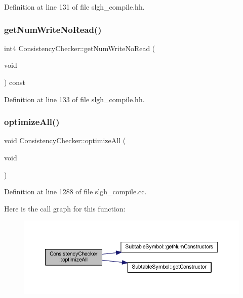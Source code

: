 Definition at line 131 of file slgh\+\_\+compile.\+hh.

\mbox{\label{class_consistency_checker_a340ac3876e27c5bdc0d0aecef6140c67}} 
\subsubsection{\texorpdfstring{getNumWriteNoRead()}{getNumWriteNoRead()}}
{\footnotesize\ttfamily int4 Consistency\+Checker\+::get\+Num\+Write\+No\+Read (\begin{DoxyParamCaption}\item[{void}]{ }\end{DoxyParamCaption}) const\hspace{0.3cm}{\ttfamily [inline]}}



Definition at line 133 of file slgh\+\_\+compile.\+hh.

\mbox{\label{class_consistency_checker_a8baa2abf8f67bb15d60e7ad3f2c28f52}} 
\subsubsection{\texorpdfstring{optimizeAll()}{optimizeAll()}}
{\footnotesize\ttfamily void Consistency\+Checker\+::optimize\+All (\begin{DoxyParamCaption}\item[{void}]{ }\end{DoxyParamCaption})}



Definition at line 1288 of file slgh\+\_\+compile.\+cc.

Here is the call graph for this function\+:
\nopagebreak
\begin{figure}[H]
\begin{center}
\leavevmode
\includegraphics[width=350pt]{class_consistency_checker_a8baa2abf8f67bb15d60e7ad3f2c28f52_cgraph}
\end{center}
\end{figure}
\mbox{\label{class_consistency_checker_a57b5de34417bedf2a556027f51656449}} 
